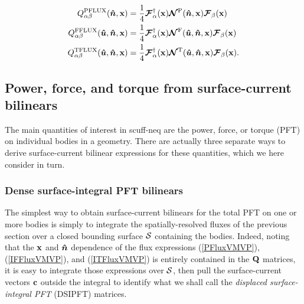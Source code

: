\documentclass[letterpaper]{article}
\begin{document}
\begin{subequations}
\begin{align}
Q_{\alpha\beta}^{\text{\scriptsize PFLUX}}(\boldsymbol{\hat{n}}, \mathbf{x})
 &= \frac{1}{4} 
    \boldsymbol{\mathcal{F}}^\dagger_\alpha(\mathbf{x}) 
    \boldsymbol{\mathcal{N}}^{\text{\scriptsize P}}(\boldsymbol{\hat{n}}, \mathbf{x})
    \boldsymbol{\mathcal{F}}_\beta(\mathbf{x}) 
\\
Q_{\alpha\beta}^{\text{\scriptsize FFLUX}}(\boldsymbol{\hat{u}}, \boldsymbol{\hat{n}}, \mathbf{x})
 &= \frac{1}{4} 
    \boldsymbol{\mathcal{F}}^\dagger_\alpha(\mathbf{x}) 
    \boldsymbol{\mathcal{N}}^{\text{\scriptsize F}}(\boldsymbol{\hat{u}}, \boldsymbol{\hat{n}}, \mathbf{x})
    \boldsymbol{\mathcal{F}}_\beta(\mathbf{x}) 
\\
Q_{\alpha\beta}^{\text{\scriptsize TFLUX}}(\boldsymbol{\hat{u}}, \boldsymbol{\hat{n}}, \mathbf{x})
 &= \frac{1}{4} 
    \boldsymbol{\mathcal{F}}^\dagger_\alpha(\mathbf{x}) 
    \boldsymbol{\mathcal{N}}^{\text{\scriptsize T}}(\boldsymbol{\hat{u}}, \boldsymbol{\hat{n}}, \mathbf{x})
    \boldsymbol{\mathcal{F}}_\beta(\mathbf{x}).
\end{align}
\label{SixBySixVMVPs}
\end{subequations}

\subsection*{Power, force, and torque from surface-current bilinears}

The main quantities of interest in {\sc scuff-neq} are the
power, force, or torque (PFT) on individual bodies in a geometry.
There are actually three separate ways to derive surface-current 
bilinear expressions for these quantities, which we here consider 
in turn.

\subsubsection*{Dense surface-integral PFT bilinears}

The simplest way to obtain surface-current bilinears for the
total PFT on one or more bodies is simply to integrate the 
spatially-resolved fluxes of the previous section over a closed
bounding surface $\mathcal{S}$ containing the bodies.
Indeed, noting that the $\mathbf{x}$ and $\boldsymbol{\hat{n}}$ dependence of
the flux expressions (\ref{PFluxVMVP}), (\ref{IFFluxVMVP}),
and (\ref{ITFluxVMVP}) is entirely contained in the $\mathbf{Q}$
matrices, it is easy to integrate those expressions over
$\mathcal{S}$, then pull the surface-current vectors $\mathbf{c}$
outside the integral to identify what we shall call
the \textit{displaced surface-integral PFT} (DSIPFT) matrices. 
\end{document}
